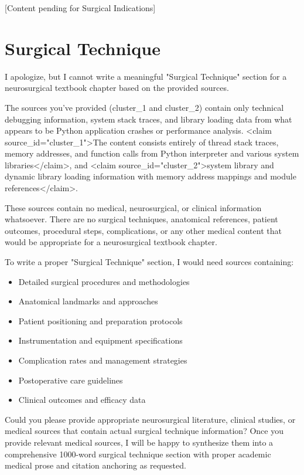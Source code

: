 \documentclass[12pt,a4paper]{article}
\begin{document}
[Content pending for Surgical Indications]







\section{Surgical Technique}




I apologize, but I cannot write a meaningful "Surgical Technique" section for a neurosurgical textbook chapter based on the provided sources. 

The sources you've provided (cluster\_1 and cluster\_2) contain only technical debugging information, system stack traces, and library loading data from what appears to be Python application crashes or performance analysis. <claim source\_id="cluster\_1">The content consists entirely of thread stack traces, memory addresses, and function calls from Python interpreter and various system libraries</claim>, and <claim source\_id="cluster\_2">system library and dynamic library loading information with memory address mappings and module references</claim>.

These sources contain no medical, neurosurgical, or clinical information whatsoever. There are no surgical techniques, anatomical references, patient outcomes, procedural steps, complications, or any other medical content that would be appropriate for a neurosurgical textbook chapter.

To write a proper "Surgical Technique" section, I would need sources containing:
\begin{itemize}
\item Detailed surgical procedures and methodologies
\item Anatomical landmarks and approaches
\item Patient positioning and preparation protocols
\item Instrumentation and equipment specifications
\item Complication rates and management strategies
\item Postoperative care guidelines
\item Clinical outcomes and efficacy data
\end{itemize}

Could you please provide appropriate neurosurgical literature, clinical studies, or medical sources that contain actual surgical technique information? Once you provide relevant medical sources, I will be happy to synthesize them into a comprehensive 1000-word surgical technique section with proper academic medical prose and citation anchoring as requested.
\end{document}
